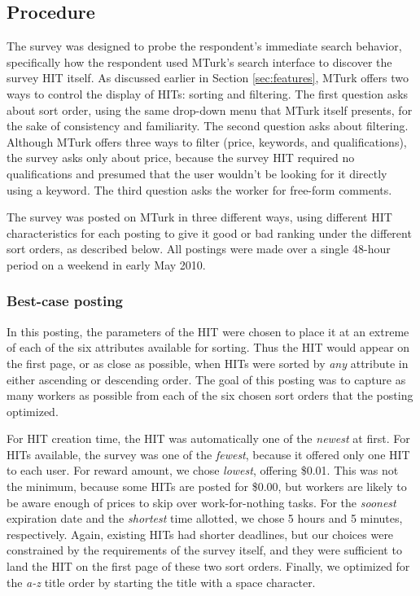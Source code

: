 \documentclass{acm_proc_article-sp}
\begin{document}
\subsection{Procedure}
The survey was designed to probe the respondent's immediate search
behavior, specifically how the respondent used MTurk's search
interface to discover the survey HIT itself. As discussed earlier in
Section \ref{sec:features}, MTurk offers two ways to control the
display of HITs: sorting and filtering.  The first question asks about
sort order, using the same drop-down menu that MTurk itself presents,
for the sake of consistency and familiarity.  The second question asks
about filtering.  Although MTurk offers three ways to filter (price,
keywords, and qualifications), the survey asks only about price,
because the survey HIT required no qualifications and presumed that
the user wouldn't be looking for it directly using a keyword.  The
third question asks the worker for free-form comments.

The survey was posted on MTurk in three different ways, using
different HIT characteristics for each posting to give it good or bad
ranking under the different sort orders, as described below.  All
postings were made over a single 48-hour period on a weekend in early
May 2010.

\subsubsection{Best-case posting}
In this posting, the parameters of the HIT were chosen to place it at
an extreme of each of the six attributes available for sorting. Thus
the HIT would appear on the first page, or as close as possible, when
HITs were sorted by {\em any} attribute in either ascending or
descending order.  The goal of this posting was to capture as many
workers as possible from each of the six chosen sort orders that the
posting optimized.

For HIT creation time, the HIT was automatically one of the {\em
  newest} at first.  For HITs available, the survey was one of the
{\em fewest}, because it offered only one HIT to each user.  For
reward amount, we chose {\em lowest}, offering \$0.01.  This was not
the minimum, because some HITs are posted for \$0.00, but workers are
likely to be aware enough of prices to skip over work-for-nothing
tasks.  For the {\em soonest} expiration date and the {\em shortest}
time allotted, we chose 5 hours and 5 minutes, respectively. Again,
existing HITs had shorter deadlines, but our choices were constrained
by the requirements of the survey itself, and they were sufficient to
land the HIT on the first page of these two sort orders.  Finally, we
optimized for the {\em a-z} title order by starting the title with a
space character.
\end{document}
